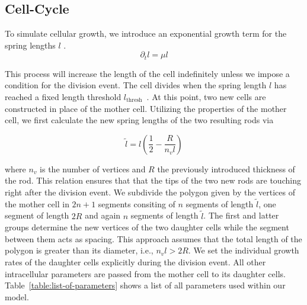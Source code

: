 \documentclass[10pt,letterpaper]{article}
\begin{document}
\subsection{Cell-Cycle}
To simulate cellular growth, we introduce an exponential growth term for the spring lengths
$l$ \cite{Takeuchi2005}.
\begin{equation}
    \partial_t l = \mu l
\end{equation}

This process will increase the length of the cell indefinitely unless we impose a condition for the
division event.
The cell divides when the spring length $l$ has reached a fixed length threshold
$l_\text{thresh}$~\cite{Robert2014}.
At this point, two new cells are constructed in place of the mother cell.
Utilizing the properties of the mother cell, we first calculate the new spring lengths of the two
resulting rods via

\begin{equation}
    \tilde{l} = l\left(\frac{1}{2} - \frac{R}{n_v l}\right)
\end{equation}

where $n_v$ is the number of vertices and $R$ the previously introduced thickness of the rod.
This relation ensures that that the tips of the two new rods are touching right after the division
event.
We subdivide the polygon given by the vertices of the mother cell in $2n+1$ segments consiting of
$n$ segments of length $\tilde{l}$, one segment of length $2R$ and again $n$ segments of length
$\tilde{l}$.
The first and latter groups determine the new vertices of the two daughter cells while the segment
between them acts as spacing.
This approach assumes that the total length of the polygon is greater than its diameter,
i.e., $n_vl>2R$.
We set the individual growth rates of the daughter cells explicitly during the division event.
All other intracellular parameters are passed from the mother cell to its daughter cells.
Table~\ref{table:list-of-parameters} shows a list of all parameters used within our model.
\end{document}
